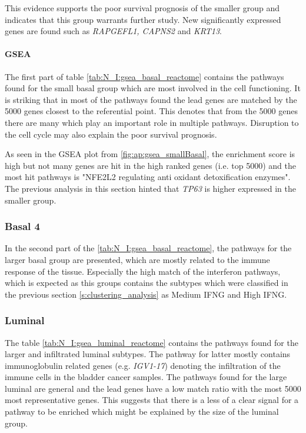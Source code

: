 This evidence supports the poor survival prognosis of the smaller group and indicates that this group warrants further study. New significantly expressed genes are found such as \textit{RAPGEFL1, CAPNS2} and \textit{KRT13}.


\paragraph*{GSEA}

The first part of table \cref{tab:N_I:gsea_basal_reactome} contains the pathways found for the small basal group which are most involved in the cell functioning. It is striking that in most of the pathways found the lead genes are matched by the 5000 genes closest to the referential point. This denotes that from the 5000 genes there are many which play an important role in multiple pathways. Disruption to the cell cycle may also explain the poor survival prognosis. 

As seen in the GSEA plot from \cref{fig:ap:gsea_smallBasal}, the enrichment score is high but not many genes are hit in the high ranked genes (i.e. top 5000) and the most hit pathways is "NFE2L2 regulating anti oxidant detoxification enzymes". The previous analysis in this section hinted that \textit{TP63} is higher expressed in the smaller group. 

\subsubsection* {Basal 4}

In the second part of the \cref{tab:N_I:gsea_basal_reactome}, the pathways for the larger basal group are presented, which are mostly related to the immune response of the tissue. Especially the high match of the interferon pathways, which is expected as this groups contains the subtypes which were classified in the previous section \cref{s:clustering_analysis} as Medium IFNG and High IFNG. 


\subsubsection*{Luminal}

The table \cref{tab:N_I:gsea_luminal_reactome} contains the pathways found for the larger and infiltrated luminal subtypes. The pathway for latter mostly contains immunoglobulin related genes (e.g. \textit{IGV1-17}) denoting the infiltration of the immune cells in the bladder cancer samples. The pathways found for the large luminal are general and the lead genes have a low match ratio with the most 5000 most representative genes. This suggests that there is a less of a clear signal for a pathway to be enriched which might be explained by the size of the luminal group. 

